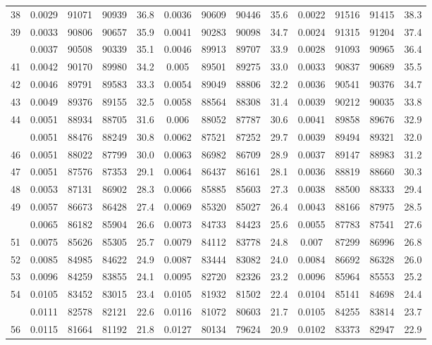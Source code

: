 \documentclass[
  14pt,
]{article}
\begin{document}
\begin{longtable}[t]{lcccccccccccc}
38 & 0.0029 & 91071 & 90939 & 36.8 & 0.0036 & 90609 & 90446 & 35.6 & 0.0022 & 91516 & 91415 & 38.3\\
39 & 0.0033 & 90806 & 90657 & 35.9 & 0.0041 & 90283 & 90098 & 34.7 & 0.0024 & 91315 & 91204 & 37.4\\
\addlinespace
40 & 0.0037 & 90508 & 90339 & 35.1 & 0.0046 & 89913 & 89707 & 33.9 & 0.0028 & 91093 & 90965 & 36.4\\
41 & 0.0042 & 90170 & 89980 & 34.2 & 0.005 & 89501 & 89275 & 33.0 & 0.0033 & 90837 & 90689 & 35.5\\
42 & 0.0046 & 89791 & 89583 & 33.3 & 0.0054 & 89049 & 88806 & 32.2 & 0.0036 & 90541 & 90376 & 34.7\\
43 & 0.0049 & 89376 & 89155 & 32.5 & 0.0058 & 88564 & 88308 & 31.4 & 0.0039 & 90212 & 90035 & 33.8\\
44 & 0.0051 & 88934 & 88705 & 31.6 & 0.006 & 88052 & 87787 & 30.6 & 0.0041 & 89858 & 89676 & 32.9\\
\addlinespace
45 & 0.0051 & 88476 & 88249 & 30.8 & 0.0062 & 87521 & 87252 & 29.7 & 0.0039 & 89494 & 89321 & 32.0\\
46 & 0.0051 & 88022 & 87799 & 30.0 & 0.0063 & 86982 & 86709 & 28.9 & 0.0037 & 89147 & 88983 & 31.2\\
47 & 0.0051 & 87576 & 87353 & 29.1 & 0.0064 & 86437 & 86161 & 28.1 & 0.0036 & 88819 & 88660 & 30.3\\
48 & 0.0053 & 87131 & 86902 & 28.3 & 0.0066 & 85885 & 85603 & 27.3 & 0.0038 & 88500 & 88333 & 29.4\\
49 & 0.0057 & 86673 & 86428 & 27.4 & 0.0069 & 85320 & 85027 & 26.4 & 0.0043 & 88166 & 87975 & 28.5\\
\addlinespace
50 & 0.0065 & 86182 & 85904 & 26.6 & 0.0073 & 84733 & 84423 & 25.6 & 0.0055 & 87783 & 87541 & 27.6\\
51 & 0.0075 & 85626 & 85305 & 25.7 & 0.0079 & 84112 & 83778 & 24.8 & 0.007 & 87299 & 86996 & 26.8\\
52 & 0.0085 & 84985 & 84622 & 24.9 & 0.0087 & 83444 & 83082 & 24.0 & 0.0084 & 86692 & 86328 & 26.0\\
53 & 0.0096 & 84259 & 83855 & 24.1 & 0.0095 & 82720 & 82326 & 23.2 & 0.0096 & 85964 & 85553 & 25.2\\
54 & 0.0105 & 83452 & 83015 & 23.4 & 0.0105 & 81932 & 81502 & 22.4 & 0.0104 & 85141 & 84698 & 24.4\\
\addlinespace
55 & 0.0111 & 82578 & 82121 & 22.6 & 0.0116 & 81072 & 80603 & 21.7 & 0.0105 & 84255 & 83814 & 23.7\\
56 & 0.0115 & 81664 & 81192 & 21.8 & 0.0127 & 80134 & 79624 & 20.9 & 0.0102 & 83373 & 82947 & 22.9\\

\end{longtable}
\end{document}

